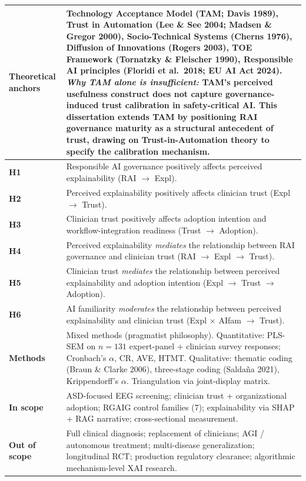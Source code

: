 {\begin{xltabular}{\textwidth}{@{} >{\raggedright\arraybackslash}p{3.0cm} L @{}}
\midrule
\textbf{Theoretical anchors} & Technology Acceptance Model (TAM; Davis 1989), Trust in Automation (Lee \& See 2004; Madsen \& Gregor 2000), Socio-Technical Systems (Cherns 1976), Diffusion of Innovations (Rogers 2003), TOE Framework (Tornatzky \& Fleischer 1990), Responsible AI principles (Floridi et al.\ 2018; EU AI Act 2024). \emph{Why TAM alone is insufficient:} TAM's perceived usefulness construct does not capture governance-induced trust calibration in safety-critical AI. This dissertation extends TAM by positioning RAI governance maturity as a structural antecedent of trust, drawing on Trust-in-Automation theory to specify the calibration mechanism. \\
\midrule
\textbf{H1} & Responsible AI governance positively affects perceived explainability \quad (RAI $\to$ Expl). \\
\textbf{H2} & Perceived explainability positively affects clinician trust \quad (Expl $\to$ Trust). \\
\textbf{H3} & Clinician trust positively affects adoption intention and workflow-integration readiness \quad (Trust $\to$ Adoption). \\
\textbf{H4} & Perceived explainability \emph{mediates} the relationship between RAI governance and clinician trust \quad (RAI $\to$ Expl $\to$ Trust). \\
\textbf{H5} & Clinician trust \emph{mediates} the relationship between perceived explainability and adoption intention \quad (Expl $\to$ Trust $\to$ Adoption). \\
\textbf{H6} & AI familiarity \emph{moderates} the relationship between perceived explainability and clinician trust \quad (Expl $\times$ AIfam $\to$ Trust). \\
\midrule
\textbf{Methods} & Mixed methods (pragmatist philosophy). Quantitative: PLS-SEM on $n=131$ expert-panel + clinician survey responses; Cronbach's $\alpha$, CR, AVE, HTMT. Qualitative: thematic coding (Braun \& Clarke 2006), three-stage coding (Salda\~na 2021), Krippendorff's $\alpha$. Triangulation via joint-display matrix. \\
\midrule
\textbf{In scope} & ASD-focused EEG screening; clinician trust + organizational adoption; RGAIG control families (7); explainability via SHAP + RAG narrative; cross-sectional measurement. \\
\textbf{Out of scope} & Full clinical diagnosis; replacement of clinicians; AGI / autonomous treatment; multi-disease generalization; longitudinal RCT; production regulatory clearance; algorithmic mechanism-level XAI research. \\

\end{xltabular}}
